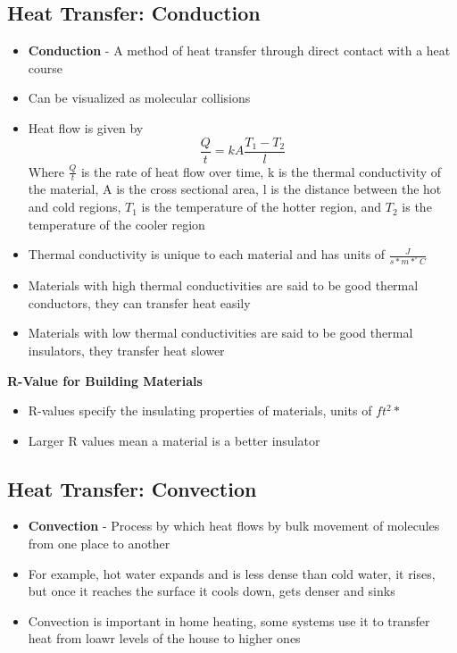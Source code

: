 \subsection{Heat Transfer: Conduction}
\begin{itemize}
    \item \textbf{Conduction} - A method of heat transfer through direct contact with a heat course
    \item Can be visualized as molecular collisions
    \item Heat flow is given by \[\frac{Q}{t}=kA\frac{T_1-T_2}{l}\] Where \(\frac{Q}{t}\) is the rate of heat flow over time, k is the thermal conductivity of the material, A is the cross sectional area, l is the distance between the hot and cold regions, \(T_1\) is the temperature of the hotter region, and \(T_2\) is the temperature of the cooler region
    \item Thermal conductivity is unique to each material and has units of \(\frac{J}{s*m*^\circ C}\)
    \item Materials with high thermal conductivities are said to be good thermal conductors, they can transfer heat easily
    \item Materials with low thermal conductivities are said to be good thermal insulators, they transfer heat slower
\end{itemize}

\textbf{R-Value for Building Materials}
\begin{itemize}
    \item R-values specify the insulating properties of materials, units of \(ft^2*\)
    \item Larger R values mean a material is a better insulator
\end{itemize}

\subsection{Heat Transfer: Convection}
\begin{itemize}
    \item \textbf{Convection} - Process by which heat flows by bulk movement of molecules from one place to another
    \item For example, hot water expands and is less dense than cold water, it rises, but once it reaches the surface it cools down, gets denser and sinks
    \item Convection is important in home heating, some systems use it to transfer heat from loawr levels of the house to higher ones
\end{itemize}

